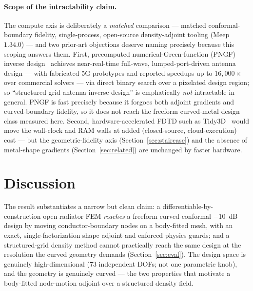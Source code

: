 \documentclass{anvil-paper}
\begin{document}
\paragraph{Scope of the intractability claim.}
The compute axis is deliberately a \emph{matched} comparison --- matched
conformal-boundary fidelity, single-process, open-source density-adjoint
tooling (Meep~$1.34.0$) --- and two prior-art objections deserve naming
precisely because this scoping answers them. First, precomputed
numerical-Green-function (PNGF) inverse design~\cite{sun2025pngf} achieves
near-real-time full-wave, lumped-port-driven antenna design --- with fabricated
5G prototypes and reported speedups up to $16{,}000\times$ over commercial
solvers --- via direct binary search over a pixelated design region; so
``structured-grid antenna inverse design'' is emphatically \emph{not}
intractable in general. PNGF is fast precisely because it forgoes both adjoint
gradients and curved-boundary fidelity, so it does not reach the freeform
curved-metal design class measured here. Second, hardware-accelerated FDTD such
as Tidy3D~\cite{tidy3dautograd} would move the wall-clock and RAM walls at
added (closed-source, cloud-execution) cost --- but the geometric-fidelity axis
(Section~\ref{sec:staircase}) and the absence of metal-shape gradients
(Section~\ref{sec:related}) are unchanged by faster hardware.

\section{Discussion}
\label{sec:discussion}

The result substantiates a narrow but clean claim: a differentiable-by-construction
open-radiator FEM \emph{reaches} a freeform curved-conformal $-10$~dB design by
moving conductor-boundary nodes on a body-fitted mesh, with an exact,
single-factorization shape adjoint and enforced physics guards; and a
structured-grid density method cannot practically reach the same design at the
resolution the curved geometry demands (Section~\ref{sec:eval}). The design
space is genuinely high-dimensional (73 independent DOFs; not one parametric
knob), and the geometry is genuinely curved --- the two properties that motivate
a body-fitted node-motion adjoint over a structured density field.
\end{document}
